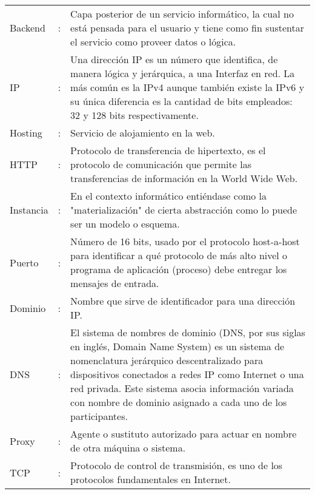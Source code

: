 \newpage
\begin{tabular}{lcp{10.5cm}}
	
Backend &:& Capa posterior de un servicio informático, la cual no está pensada para el usuario y tiene como fin sustentar el servicio como proveer datos o lógica.\\
IP &:& Una dirección IP es un número que identifica, de manera lógica y jerárquica, a una Interfaz en red. La más común es la IPv4 aunque también existe la IPv6 y su única diferencia es la cantidad de bits empleados: 32 y 128 bits respectivamente.\\

Hosting &:& Servicio de alojamiento en la web.\\

HTTP &:& Protocolo de transferencia de hipertexto, es el protocolo de comunicación que permite las transferencias de información en la World Wide Web.\\

Instancia &:& En el contexto informático entiéndase como la "materialización" de cierta abstracción como lo puede ser un modelo o esquema.\\

Puerto &:& Número de 16 bits, usado por el protocolo host-a-host para identificar a qué protocolo de más alto nivel o programa de aplicación (proceso) debe entregar los mensajes de entrada.\\

Dominio &:& Nombre que sirve de identificador para una dirección IP. \\

DNS &:& El sistema de nombres de dominio (DNS, por sus siglas en inglés, Domain Name System) es un sistema de nomenclatura jerárquico descentralizado para dispositivos conectados a redes IP como Internet o una red privada. Este sistema asocia información variada con nombre de dominio asignado a cada uno de los participantes.\\


Proxy &:& Agente o sustituto autorizado para actuar en nombre de otra máquina o sistema.\\

TCP &:& Protocolo de control de transmisión, es uno de los protocolos fundamentales en Internet.\\

\end{tabular}

